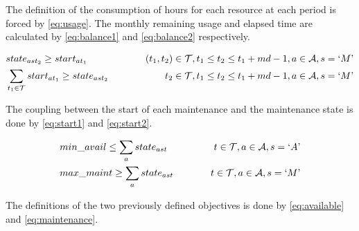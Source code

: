 \documentclass{roadef}
\newcommand{\mq}[1] {`#1\textrm'}
\begin{document}

    The definition of the consumption of hours for each resource at each period is forced by \ref{eq:usage}. The monthly remaining usage and elapsed time are calculated by \ref{eq:balance1} and \ref{eq:balance2} respectively.

    \begin{align}
        & state_{ast_2} \geq start_{at_1} 
                & \hspace{10mm} (t_1, t_2) \in \mathcal{T}, t_1 \leq t_2 \leq t_1 + md - 1, a \in \mathcal{A}, s = \mq{M} \label{eq:start1}\\
        & \sum_{t_1 \in \mathcal{T}} start_{at_1} \geq state_{ast_2} 
                & \hspace{10mm} t_2 \in \mathcal{T}, t_1 \leq t_2 \leq t_1 + md - 1, a \in \mathcal{A}, s = \mq{M} \label{eq:start2}
    \end{align}


    The coupling between the start of each maintenance and the maintenance state is done by \ref{eq:start1} and \ref{eq:start2}.

    \begin{align}
        & min\_avail \leq \sum_{a} state_{ast}
                & \hspace{10mm} t \in \mathcal{T}, a \in \mathcal{A}, s = \mq{A} \label{eq:available}\\
        & max\_maint \geq \sum_{a} state_{ast}
                & \hspace{10mm} t \in \mathcal{T}, a \in \mathcal{A}, s = \mq{M} \label{eq:maintenance}
    \end{align}

    The definitions of the two previously defined objectives is done by \ref{eq:available} and \ref{eq:maintenance}.
\end{document}
